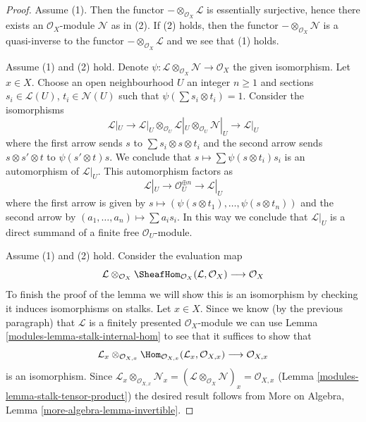 \begin{proof}

Assume (1). Then the functor $- \otimes_{\mathcal{O}_X} \mathcal{L}$
is essentially surjective, hence there exists an $\mathcal{O}_X$-module
$\mathcal{N}$ as in (2). If (2) holds, then the functor
$- \otimes_{\mathcal{O}_X} \mathcal{N}$ is a quasi-inverse
to the functor $- \otimes_{\mathcal{O}_X} \mathcal{L}$ and
we see that (1) holds.

\medskip\noindent
Assume (1) and (2) hold. Denote
$\psi : \mathcal{L} \otimes_{\mathcal{O}_X} \mathcal{N} \to \mathcal{O}_X$
the given isomorphism. Let $x \in X$. Choose an open neighbourhood
$U$ an integer $n \geq 1$ and sections $s_i \in \mathcal{L}(U)$,
$t_i \in \mathcal{N}(U)$ such that $\psi(\sum s_i \otimes t_i) = 1$.
Consider the isomorphisms
$$
\mathcal{L}|_U \to
\mathcal{L}|_U \otimes_{\mathcal{O}_U}
\mathcal{L}|_U \otimes_{\mathcal{O}_U} \mathcal{N}|_U \to \mathcal{L}|_U
$$
where the first arrow sends $s$ to $\sum s_i \otimes s \otimes t_i$
and the second arrow sends $s \otimes s' \otimes t$ to $\psi(s' \otimes t)s$.
We conclude that $s \mapsto \sum \psi(s \otimes t_i)s_i$ is
an automorphism of $\mathcal{L}|_U$. This automorphism factors as
$$
\mathcal{L}|_U \to \mathcal{O}_U^{\oplus n} \to \mathcal{L}|_U
$$
where the first arrow is given by
$s \mapsto (\psi(s \otimes t_1), \ldots, \psi(s \otimes t_n))$
and the second arrow by $(a_1, \ldots, a_n) \mapsto \sum a_i s_i$.
In this way we conclude that $\mathcal{L}|_U$ is a direct summand
of a finite free $\mathcal{O}_U$-module.

\medskip\noindent
Assume (1) and (2) hold. Consider the evaluation map
$$
\mathcal{L} \otimes_{\mathcal{O}_X}
\SheafHom_{\mathcal{O}_X}(\mathcal{L}, \mathcal{O}_X)
\longrightarrow \mathcal{O}_X
$$
To finish the proof of the lemma
we will show this is an isomorphism by checking it induces
isomorphisms on stalks. Let $x \in X$.
Since we know (by the previous paragraph)
that $\mathcal{L}$ is a finitely presented
$\mathcal{O}_X$-module
we can use Lemma \ref{modules-lemma-stalk-internal-hom}
to see that it suffices to show that
$$
\mathcal{L}_x \otimes_{\mathcal{O}_{X, x}}
\Hom_{\mathcal{O}_{X, x}}(\mathcal{L}_x, \mathcal{O}_{X, x})
\longrightarrow \mathcal{O}_{X, x}
$$
is an isomorphism. Since
$\mathcal{L}_x \otimes_{\mathcal{O}_{X, x}} \mathcal{N}_x =
(\mathcal{L} \otimes_{\mathcal{O}_X} \mathcal{N})_x =
\mathcal{O}_{X, x}$ (Lemma \ref{modules-lemma-stalk-tensor-product})
the desired result follows from
More on Algebra, Lemma \ref{more-algebra-lemma-invertible}.
\end{proof}

